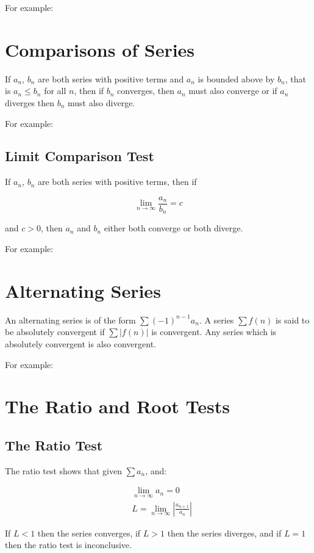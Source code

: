 \documentclass{article}
\begin{document}
For example:

\section{Comparisons of Series}

If $a_n$, $b_n$ are both series with positive terms and $a_n$ is
bounded above by $b_n$, that is $a_n \leq b_n$ for all $n$, then if
$b_n$ converges, then $a_n$ must also converge or if $a_n$ diverges
then $b_n$ must also diverge.

For example:

\subsection{Limit Comparison Test}

If $a_n$, $b_n$ are both series with positive terms, then if

\[
\lim_{n \to \infty} \frac{a_n}{b_n} = c
\]

and $c > 0$, then $a_n$ and $b_n$ either both converge or both diverge.

For example:

\section{Alternating Series}

An alternating series is of the form $\sum (-1)^{n-1}a_n$.  A series
$\sum f(n)$ is said to be absolutely convergent if $\sum \left|
  f(n) \right|$ is convergent.  Any series which is absolutely
convergent is also convergent.

For example:

\section{The Ratio and Root Tests}

\subsection{The Ratio Test}

The ratio test shows that given $\sum a_n$, and:

\begin{align*}
  &\lim_{n \to \infty} a_n = 0 \\
  &L = \lim_{n \to \infty} \left| \frac{a_{n+1}}{a_n} \right|
\end{align*}

If $L<1$ then the series converges, if $L>1$ then the series diverges,
and if $L=1$ then the ratio test is inconclusive.
\end{document}
